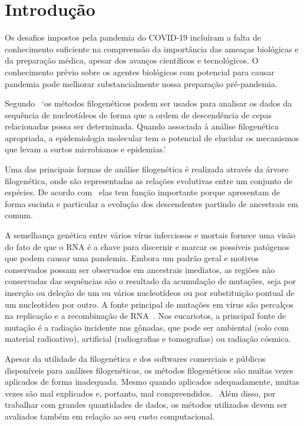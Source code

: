 \chapter{Introdução}

Os desafios impostos pela pandemia do COVID-19 incluíram a falta de conhecimento suficiente na compreensão da importância das ameaças biológicas e da preparação médica, apesar dos avanços científicos e tecnológicos. O conhecimento prévio sobre os agentes biológicos com potencial para causar pandemia pode melhorar substancialmente nossa preparação pré-pandemia.~\cite[p. 1]{behl_threat_2022}

Segundo~\cite[p.1]{barry_phylogenetic_analysis_2006} `os métodos filogenéticos podem ser usados para analisar os dados da sequência de nucleotídeos de forma que a ordem de descendência de cepas relacionadas possa ser determinada. Quando associada à análise filogenética apropriada, a epidemiologia molecular tem o potencial de elucidar os mecanismos que levam a surtos microbianos e epidemias.'

Uma das principais formas de análise filogenética é realizada através da árvore filogenética, onde são representadas as relações evolutivas entre um conjunto de espécies. De acordo com~\cite{morrison_tree_thinking} elas tem função importante porque apresentam de forma sucinta e particular a evolução dos descendentes partindo de ancestrais em comum.

A semelhança genética entre vários vírus infecciosos e mortais fornece uma visão do fato de que o RNA é a chave para discernir e marcar os possíveis patógenos que podem causar uma pandemia. Embora um padrão geral e motivos conservados possam ser observados em ancestrais imediatos, as regiões não conservadas das sequências são o resultado da acumulação de mutações, seja por inserção ou deleção de um ou vários nucleotídeos ou por substituição pontual de um nucleotídeo por outro. A fonte principal de mutações em vírus são percalços na replicação e a recombinação de RNA~\cite[p. 11]{behl_threat_2022}. Nos eucariotos, a principal fonte de mutação é a radiação incidente nas gônadas, que pode ser ambiental (solo com material radioativo), artificial (radiografias e tomografias) ou radiação cósmica.

Apesar da utilidade da filogenética e dos softwares comerciais e públicos disponíveis para análises filogenéticas, os métodos filogenéticos são muitas vezes aplicados de forma inadequada. Mesmo quando aplicados adequadamente, muitas vezes são mal explicados e, portanto, mal compreendidos.~\cite[p. 1]{barry_phylogenetic_analysis_2006} Além disso, por trabalhar com grandes quantidades de dados, os métodos utilizados devem ser avaliados também em relação ao seu custo computacional.

